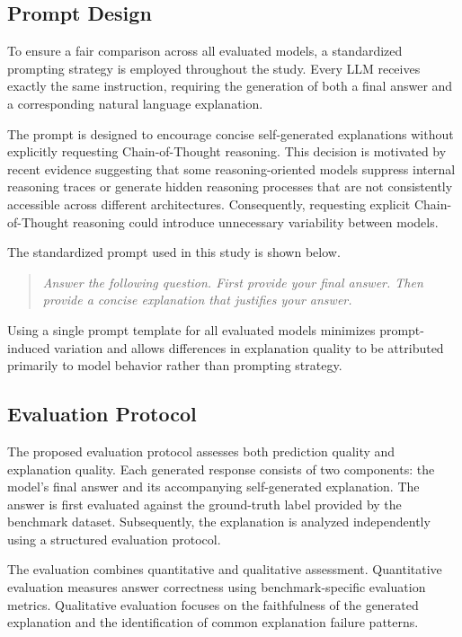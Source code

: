 \documentclass{article}
\begin{document}
\subsection{Prompt Design}

To ensure a fair comparison across all evaluated models, a standardized prompting strategy is employed throughout the study. Every LLM receives exactly the same instruction, requiring the generation of both a final answer and a corresponding natural language explanation.

The prompt is designed to encourage concise self-generated explanations without explicitly requesting Chain-of-Thought reasoning. This decision is motivated by recent evidence suggesting that some reasoning-oriented models suppress internal reasoning traces or generate hidden reasoning processes that are not consistently accessible across different architectures. Consequently, requesting explicit Chain-of-Thought reasoning could introduce unnecessary variability between models.

The standardized prompt used in this study is shown below.

\begin{quote}
\textit{
Answer the following question. First provide your final answer. Then provide a concise explanation that justifies your answer.
}
\end{quote}

Using a single prompt template for all evaluated models minimizes prompt-induced variation and allows differences in explanation quality to be attributed primarily to model behavior rather than prompting strategy.

\subsection{Evaluation Protocol}

The proposed evaluation protocol assesses both prediction quality and explanation quality. Each generated response consists of two components: the model's final answer and its accompanying self-generated explanation. The answer is first evaluated against the ground-truth label provided by the benchmark dataset. Subsequently, the explanation is analyzed independently using a structured evaluation protocol.

The evaluation combines quantitative and qualitative assessment. Quantitative evaluation measures answer correctness using benchmark-specific evaluation metrics. Qualitative evaluation focuses on the faithfulness of the generated explanation and the identification of common explanation failure patterns.
\end{document}
